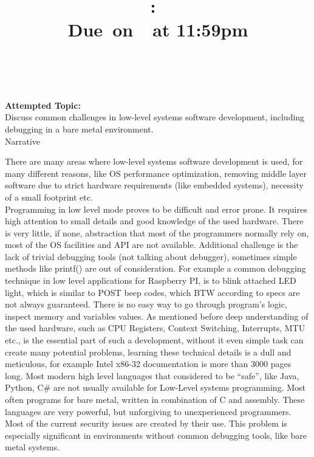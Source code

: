 \documentclass{article}
\title{
    \vspace{2in}
    \textmd{\textbf{\hmwkClass:\ \hmwkTitle}}\\
    \normalsize\vspace{0.1in}\small{Due\ on\ \hmwkDueDate\ at 11:59pm}\\
    \vspace{0.1in}\large{\textit{\hmwkClassInstructor\ \hmwkClassTime}}
    \vspace{3in}
}
\author{\textbf{\hmwkAuthorName}}
\date{}
\begin{document}
\maketitle

\pagebreak

\textbf{Attempted Topic: }\\
Discuss common challenges in low-level systems software development, including debugging in
a bare metal environment.\\

Narrative
\vspace{0.5cm}


There are many areas where low-level systems software development is used, for many
different reasons, like OS performance optimization, removing middle layer software due to strict
hardware requirements (like embedded systems), necessity of a small footprint etc. \\

\indent
Programming in low level mode proves to be difficult and error prone. It requires high
attention to small details and good knowledge of the used hardware. There is very little, if none,
abstraction that most of the programmers normally rely on, most of the OS facilities and API are not
available. Additional challenge is the lack of trivial debugging tools (not talking about
debugger), sometimes simple methods like printf() are out of consideration. For example a
common debugging technique in low level applications for Raspberry PI, is to blink attached
LED light, which is similar to POST beep codes, which BTW according to specs are not always
guaranteed.  There is no easy way to go through program's logic, inspect memory and variables values.
As mentioned before deep understanding of the used hardware, such as CPU
Registers, Context Switching, Interrupts, MTU etc., is the essential part of such a
development, without it even simple task can create many potential problems, learning these
technical details is a dull and meticulous, for example Intel x86-32 documentation is more than
3000 pages long. Most modern high level languages that considered to be ``safe'', like Java,
Python, C\# are not usually available for Low-Level systems programming. Most often programs
for bare metal, written in combination of C and assembly. These languages are very powerful,
but unforgiving to unexperienced programmers. Most of the current security issues are
created by their use. This problem is especially significant in environments without common
debugging tools, like bare metal systems.
\\
\end{document}
